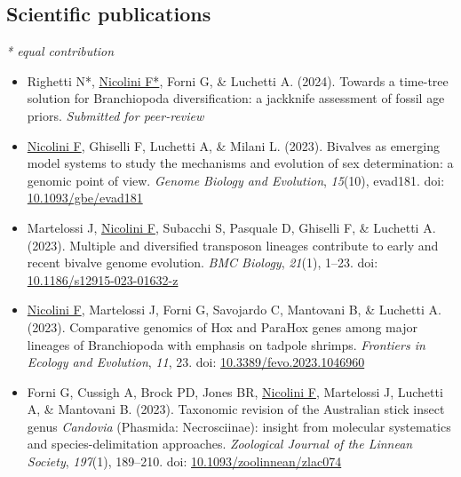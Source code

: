 \subsection*{Scientific publications}
\small{\textit{* equal contribution}}
\begin{itemize}
    \item Righetti N*, \underline{Nicolini F*}, Forni G, \& Luchetti A. (2024). Towards a time-tree solution for Branchiopoda diversification: a jackknife assessment of fossil age priors. \textit{Submitted for peer-review}
    \item \underline{Nicolini F}, Ghiselli F, Luchetti A, \& Milani L. (2023). Bivalves as emerging model systems to study the mechanisms and evolution of sex determination: a genomic point of view. \textit{Genome Biology and Evolution}, \textit{15}(10), evad181. doi: \href{https://doi.org/10.1093/gbe/evad181}{10.1093/gbe/evad181}
    \item Martelossi J, \underline{Nicolini F}, Subacchi S, Pasquale D, Ghiselli F, \& Luchetti A. (2023). Multiple and diversified transposon lineages contribute to early and recent bivalve genome evolution. \textit{BMC Biology}, \textit{21}(1), 1--23. doi: \href{https://doi.org/10.1186/s12915-023-01632-z}{10.1186/s12915-023-01632-z}
    \item \underline{Nicolini F}, Martelossi J, Forni G, Savojardo C, Mantovani B, \& Luchetti A. (2023). Comparative genomics of Hox and ParaHox genes among major lineages of Branchiopoda with emphasis on tadpole shrimps. \textit{Frontiers in Ecology and Evolution}, \textit{11}, 23. doi: \href{https://doi.org/10.3389/fevo.2023.1046960}{10.3389/fevo.2023.1046960}
    \item Forni G, Cussigh A, Brock PD, Jones BR, \underline{Nicolini F}, Martelossi J, Luchetti A, \& Mantovani B. (2023). Taxonomic revision of the Australian stick insect genus \textit{Candovia} (Phasmida: Necrosciinae): insight from molecular systematics and species-delimitation approaches. \textit{Zoological Journal of the Linnean Society}, \textit{197}(1), 189--210. doi: \href{https://doi.org/10.1093/zoolinnean/zlac074}{10.1093/zoolinnean/zlac074}
\end{itemize}